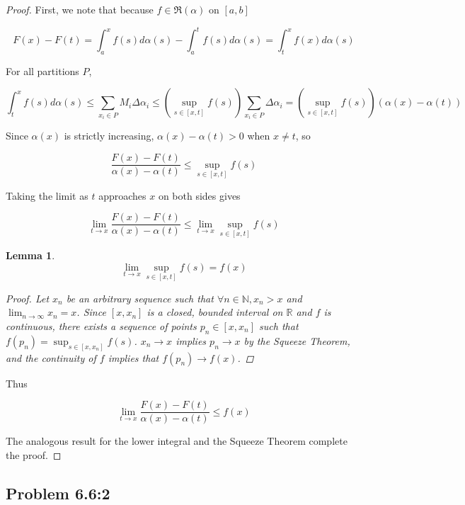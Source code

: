 \documentclass{amsart}
\newcommand{\RiemannIntable}{
  \mathfrak{R}
}
\newtheorem{lemma}{Lemma}[subsubsection]
\begin{document}
\begin{proof}

First, we note that because $f \in \RiemannIntable(\alpha)$ on $[a, b]$

\[F(x) - F(t) = \int_a^x f(s)d\alpha(s) - \int_a^t f(s) d\alpha(s) = \int_t^x f(x) d\alpha(s)
\]

For all partitions $P$,

\[
\int_t^x f(s) d\alpha(s)
\leq \sum_{x_i \in P} M_i \Delta \alpha_i
\leq \left(\sup_{s \in [x, t]} f(s) \right) \sum_{x_i \in P} \Delta \alpha_i
= \left(\sup_{s \in [x, t]} f(s) \right) (\alpha(x) - \alpha(t))
\]

Since $\alpha(x)$ is strictly increasing, $\alpha(x) - \alpha(t) > 0$ when $x \neq t$, so

\[
\frac{F(x) - F(t)}{\alpha(x) - \alpha(t)} \leq \sup_{s \in [x, t]} f(s)
\]

Taking the limit as $t$ approaches $x$ on both sides gives

\[
\lim_{t \to x} \frac{F(x) - F(t)}{\alpha(x) - \alpha(t)} \leq \lim_{t \to x} \sup_{s \in [x, t]} f(s)
\]

\begin{lemma}

\[
\lim_{t \to x} \sup_{s \in [x, t]} f(s) = f(x)
\]

\begin{proof}

Let $x_n$ be an arbitrary sequence such that $\forall n \in \mathbb{N}, x_n > x$ and $\lim_{n \to \infty} x_n = x$. Since $[x, x_n]$ is a closed, bounded interval on $\mathbb{R}$ and $f$ is continuous, there exists a sequence of points $p_n \in [x, x_n]$ such that $f(p_n) =  \sup_{s \in [x, x_n]} f(s)$. $x_n \rightarrow x$ implies $p_n \rightarrow x$ by the Squeeze Theorem, and the continuity of $f$ implies that $f(p_n) \rightarrow f(x)$.

\end{proof}
\end{lemma}

Thus

\[
\lim_{t \to x} \frac{F(x) - F(t)}{\alpha(x) - \alpha(t)} \leq f(x)
\]

The analogous result for the lower integral and the Squeeze Theorem complete the proof.

\end{proof}

\subsection*{Problem 6.6:2}
\end{document}
